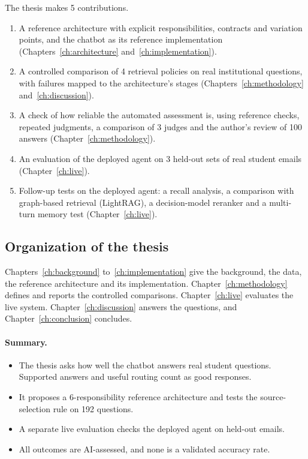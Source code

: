 The thesis makes 5 contributions.
\begin{enumerate}
  \item A reference architecture with explicit responsibilities, contracts and variation points, and the chatbot as its reference implementation (Chapters~\ref{ch:architecture} and~\ref{ch:implementation}).
  \item A controlled comparison of 4 retrieval policies on real institutional questions, with failures mapped to the architecture's stages (Chapters~\ref{ch:methodology} and~\ref{ch:discussion}).
  \item A check of how reliable the automated assessment is, using reference checks, repeated judgments, a comparison of 3 judges and the author's review of 100 answers (Chapter~\ref{ch:methodology}).
  \item An evaluation of the deployed agent on 3 held-out sets of real student emails (Chapter~\ref{ch:live}).
  \item Follow-up tests on the deployed agent: a recall analysis, a comparison with graph-based retrieval (LightRAG), a decision-model reranker and a multi-turn memory test (Chapter~\ref{ch:live}).
\end{enumerate}



\subsection{Organization of the thesis}

Chapters~\ref{ch:background} to~\ref{ch:implementation} give the background, the data, the reference architecture and its implementation. Chapter~\ref{ch:methodology} defines and reports the controlled comparisons. Chapter~\ref{ch:live} evaluates the live system. Chapter~\ref{ch:discussion} answers the questions, and Chapter~\ref{ch:conclusion} concludes.

\paragraph{Summary.}
\begin{itemize}
  \item The thesis asks how well the chatbot answers real student questions. Supported answers and useful routing count as good responses.
  \item It proposes a 6-responsibility reference architecture and tests the source-selection rule on 192 questions.
  \item A separate live evaluation checks the deployed agent on held-out emails.
  \item All outcomes are AI-assessed, and none is a validated accuracy rate.
\end{itemize}
